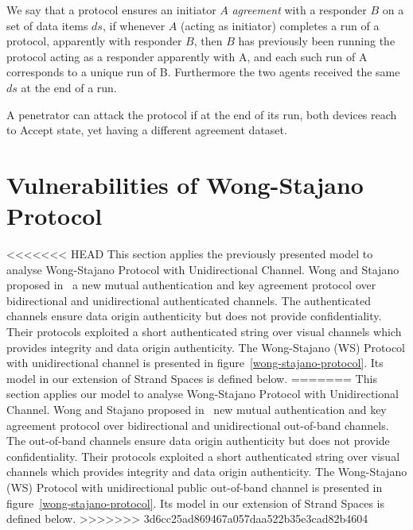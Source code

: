 \begin{itemize}
\begin{Definition} We say that a protocol ensures an initiator $A$ \textit{agreement} with a responder $B$ on a set of data items $ds$, if whenever $A$ (acting as initiator) completes a run of a protocol, apparently with responder $B$, then $B$ has previously been running the protocol acting as a responder apparently with A, and each such run of A corresponds to a unique run of B. Furthermore the two agents received the same $ds$ at the end of a run. 
\end{Definition}

A penetrator can attack the protocol if at the end of its run, both devices reach to Accept state, yet having a different agreement dataset. 

\section{Vulnerabilities of Wong-Stajano Protocol}\label{analysisWSP}

<<<<<<< HEAD
This section applies the previously presented model to analyse Wong-Stajano Protocol with Unidirectional Channel. Wong and Stajano proposed in~\cite{10.1109/MPRV.2007.76} a new mutual authentication and key agreement protocol over bidirectional and unidirectional authenticated channels. The authenticated channels ensure data origin authenticity but does not provide confidentiality. Their protocols exploited a short authenticated string over visual channels which provides integrity and data origin authenticity. The Wong-Stajano (WS) Protocol with unidirectional channel is presented in figure~\ref{wong-stajano-protocol}. Its model in our extension of Strand Spaces is defined below.
=======
This section applies our model to analyse Wong-Stajano Protocol with Unidirectional Channel. Wong and Stajano proposed in~\cite{10.1109/MPRV.2007.76} new mutual authentication and key agreement protocol over bidirectional and unidirectional out-of-band channels. The out-of-band channels ensure data origin authenticity but does not provide confidentiality. Their protocols exploited a short authenticated string over visual channels which provides integrity and data origin authenticity. The Wong-Stajano (WS) Protocol with unidirectional public out-of-band channel is presented in figure~\ref{wong-stajano-protocol}. Its model in our extension of Strand Spaces is defined below.
>>>>>>> 3d6cc25ad869467a057daa522b35e3cad82b4604


\end{itemize}
